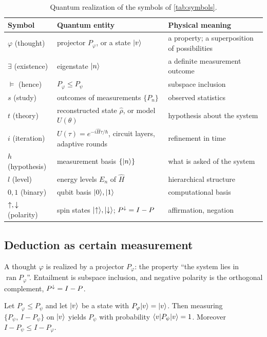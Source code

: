 \begin{table}[ht]
\centering\small
\begin{tabular}{@{}l>{\raggedright}p{}>{\raggedright\arraybackslash}p{}@{}}
\toprule
Symbol & Quantum entity & Physical meaning \\
\midrule
$\varphi$ (thought) & projector $P_\varphi$, or a state $\lvert v\rangle$ & a property; a superposition of possibilities \\
$\exists$ (existence) & eigenstate $\lvert n\rangle$ & a definite measurement outcome \\
$\models$ (hence) & $P_\varphi\le P_\psi$ & subspace inclusion \\
$s$ (study) & outcomes of measurements $\{P_n\}$ & observed statistics \\
$t$ (theory) & reconstructed state $\hat\rho$, or model $U(\theta)$ & hypothesis about the system \\
$i$ (iteration) & $U(\tau)=e^{-i\hat H\tau/\hbar}$, circuit layers, adaptive rounds & refinement in time \\
$h$ (hypothesis) & measurement basis $\{\lvert n\rangle\}$ & what is asked of the system \\
$l$ (level) & energy levels $E_n$ of $\hat H$ & hierarchical structure \\
$0,1$ (binary) & qubit basis $\lvert 0\rangle,\lvert 1\rangle$ & computational basis \\
${\uparrow},{\downarrow}$ (polarity) & spin states $\lvert {\uparrow}\rangle,\lvert {\downarrow}\rangle$; $P^{{\downarrow}}=I-P$ & affirmation, negation \\
\bottomrule
\end{tabular}
\caption{Quantum realization of the symbols of \cref{tab:symbols}.}
\label{tab:quantum}
\end{table}

\subsection{Deduction as certain measurement}

A thought $\varphi$ is realized by a projector $P_\varphi$: the property ``the system lies in
$\operatorname{ran}P_\varphi$''. Entailment is subspace inclusion, and negative polarity is the
orthogonal complement, $P^{{\downarrow}}=I-P$.

\begin{proposition}\label{prop:qsound}
Let $P_\varphi\le P_\psi$ and let $\lvert v\rangle$ be a state with $P_\varphi\lvert v\rangle=\lvert v\rangle$. Then measuring
$\{P_\psi,\,I-P_\psi\}$ on $\lvert v\rangle$ yields $P_\psi$ with probability
$\langle v\rvert P_\psi\lvert v\rangle=1$. Moreover $I-P_\psi\le I-P_\varphi$.
\end{proposition}

